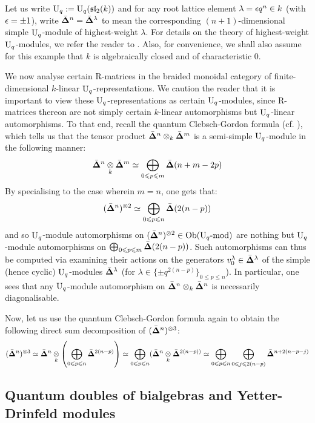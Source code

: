         \begin{example}
            Let us write $\mathrm{U}_q := \mathrm{U}_q(\mathfrak{sl}_2(k))$ and for any root lattice element $\lambda = \epsilon q^n\in k$ (with $\epsilon = \pm 1$), write $\bar{ \mathbf{ \Delta } }^n = \bar{ \mathbf{ \Delta } }^{\lambda}$ to mean the corresponding $(n + 1)$-dimensional simple $\mathrm{U}_q$-module of highest-weight $\lambda$. For details on the theory of highest-weight $\mathrm{U}_q$-modules, we refer the reader to \cite[Chapters VI and VII]{kassel_quantum_groups}. Also, for convenience, we shall also assume for this example that $k$ is algebraically closed and of characteristic $0$. 
            
            We now analyse certain R-matrices in the braided monoidal category of finite-dimensional $k$-linear $\mathrm{U}_q$-representations. We caution the reader that it is important to view these $\mathrm{U}_q$-representations as certain $\mathrm{U}_q$-modules, since R-matrices thereon are not simply certain $k$-linear automorphisms but $\mathrm{U}_q$-linear automorphisms. To that end, recall the quantum Clebsch-Gordon formula (cf. \cite[Theorem VII.7.1]{kassel_quantum_groups}), which tells us that the tensor product $\qsimple^n \tensor_k \qsimple^m$ is a semi-simple $\mathrm{U}_q$-module in the following manner:
                $$\qsimple^n \tensor_k \qsimple^m \cong \bigoplus_{0 \leq p \leq m} \qsimple(n + m - 2p)$$
            By specialising to the case wherein $m = n$, one gets that:
                $$(\qsimple^n)^{\tensor 2} \cong \bigoplus_{0 \leq p \leq n} \qsimple(2(n - p))$$
            and so $\mathrm{U}_q$-module automorphisms on $(\qsimple^n)^{\tensor 2} \in \Ob(\rmU_q\mod)$ are nothing but $\mathrm{U}_q$-module automorphisms on $\bigoplus_{0 \leqslant p \leqslant m} \bar{ \mathbf{ \Delta } }(2(n - p))$. Such automorphisms can thus be computed via examining their actions on the generators $v^{\lambda}_0 \in \bar{ \mathbf{ \Delta } }^{\lambda}$ of the simple (hence cyclic) $\mathrm{U}_q$-modules $\bar{ \mathbf{ \Delta } }^{\lambda}$ (for $\lambda \in \{\pm q^{ 2(n - p) }\}_{0 \leq p \leq n}$). In particular, one sees that any $\mathrm{U}_q$-module automorphism on $\qsimple^n \tensor_k \qsimple^n$ is necessarily diagonalisable. 
            
            Now, let us use the quantum Clebsch-Gordon formula again to obtain the following direct sum decomposition of $(\qsimple^n)^{\tensor 3}$:
                $$(\qsimple^n)^{\tensor 3} \cong \qsimple^n \tensor_k \left( \bigoplus_{0 \leq p \leq n} \qsimple^{2(n - p)} \right) \cong \bigoplus_{0 \leq p \leq n} ( \qsimple^n \tensor_k \qsimple^{2(n - p))} \cong \bigoplus_{0 \leq p \leq n} \bigoplus_{0 \leq j \leq 2(n - p)} \qsimple^{n + 2(n - p - j)}$$
        \end{example}
    
    \subsection{Quantum doubles of bialgebras and Yetter-Drinfeld modules}